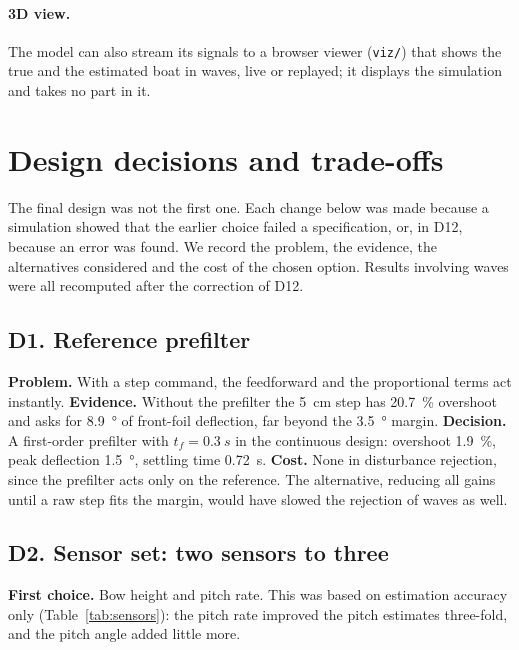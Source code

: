 \documentclass[11pt,a4paper]{article}
\begin{document}
\paragraph{3D view.} The model can also stream its signals to a browser viewer
(\texttt{viz/}) that shows the true and the estimated boat in waves, live or
replayed; it displays the simulation and takes no part in it.

\section{Design decisions and trade-offs}
\label{sec:log}

The final design was not the first one. Each change below was made because a
simulation showed that the earlier choice failed a specification, or, in D12,
because an error was found. We record the problem, the evidence, the
alternatives considered and the cost of the chosen option. Results involving
waves were all recomputed after the correction of D12.

\subsection{D1. Reference prefilter}

\textbf{Problem.} With a step command, the feedforward and the proportional
terms act instantly. \textbf{Evidence.} Without the prefilter the \SI{5}{cm} step
has \SI{20.7}{\percent} overshoot and asks for \SI{8.9}{\degree} of front-foil
deflection, far beyond the \SI{3.5}{\degree} margin. \textbf{Decision.} A
first-order prefilter with $t_f=\SI{0.3}{s}$ in the continuous design: overshoot
\SI{1.9}{\percent}, peak deflection \SI{1.5}{\degree}, settling time
\SI{0.72}{s}. \textbf{Cost.} None in disturbance rejection, since the prefilter
acts only on the reference. The alternative, reducing all gains until a raw step
fits the margin, would have slowed the rejection of waves as well.

\subsection{D2. Sensor set: two sensors to three}

\textbf{First choice.} Bow height and pitch rate. This was based on estimation
accuracy only (Table~\ref{tab:sensors}): the pitch rate improved the pitch
estimates three-fold, and the pitch angle added little more.
\end{document}
